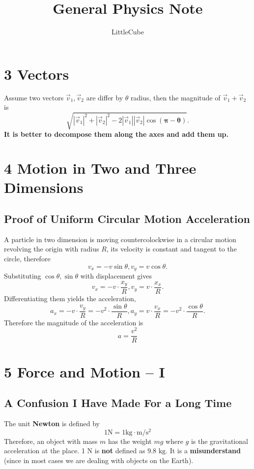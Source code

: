 \documentclass[12pt,a4paper]{report}
\begin{document}
  \title{General Physics Note}
  \author{LittleCube \Huge{}}

  \maketitle

  \section*{3 Vectors}
  Assume two vectors \(\vec v_1,\vec v_2\) are differ by \(\theta\) radius, then the magnitude of \(\vec v_1 + \vec v_2\) is  
  \[\sqrt{ |\vec v_1|^2 + |\vec v_2|^2 - 2|\vec v_1| |\vec v_2| \cos \boldsymbol{(\pi - \theta)}}.\]
  \textbf{It is better to decompose them along the axes and add them up.}

  \section*{4 Motion in Two and Three Dimensions}
  \subsection*{Proof of Uniform Circular Motion Acceleration}
  A particle in two dimension is moving countercolockwise in a circular motion revolving the origin with radius \(R\), its velocity is constant and tangent to the circle, therefore
  \[v_x = - v \sin \theta, v_y = v \cos \theta.\]
  Substituting \(\cos \theta, \sin \theta\) with displacement gives
  \[v_x = - v \cdot \frac{x_y}{R}, v_y = v \cdot \frac{x_x}{R}.\]
  Differentiating them yields the acceleration,
  \[a_x = - v \cdot \frac{v_y}{R} = - v^2 \cdot \frac{\sin \theta}{R}, a_y = v \cdot \frac{v_x}{R} = - v^2 \cdot \frac{\cos \theta}{R}.\]
  Therefore the magnitude of the acceleration is
  \[a = \frac{v^2}{R}\]

  \section*{5 Force and Motion -- I}
  \subsection*{A Confusion I Have Made For a Long Time}

  The unit \textbf{Newton} is defined by
  \[1 \mathrm{N} = 1 \mathrm{kg \cdot m/s^2}\]
  Therefore, an object with mass \(m\) has the weight \(mg\) where \(g\) is the gravitational acceleration at the place.  
  1 \(\mathrm{N}\) is \textbf{not} defined as 9.8 \(\mathrm{kg}\). It is a \textbf{misunderstand} (since in most cases we are dealing with objects on the Earth).
  
\end{document}
